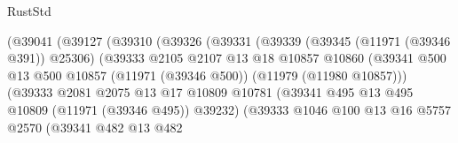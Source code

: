 \begin{lexlean}{RustStd}
\begin{coremodule}
                                  (@39041
                                    (@39127
                                      (@39310
                                        (@39326
                                          (@39331
                                            (@39339
                                              (@39345 (@11971 (@39346 @391)) @25306)
                                              (@39333
                                                @2105
                                                @2107
                                                @13
                                                @18
                                                @10857
                                                @10860
                                                (@39341
                                                  @500
                                                  @13
                                                  @500
                                                  @10857
                                                  (@11971 (@39346 @500))
                                                  (@11979 (@11980 @10857)))
                                                (@39333
                                                  @2081
                                                  @2075
                                                  @13
                                                  @17
                                                  @10809
                                                  @10781
                                                  (@39341
                                                    @495
                                                    @13
                                                    @495
                                                    @10809
                                                    (@11971 (@39346 @495))
                                                    @39232)
                                                  (@39333
                                                    @1046
                                                    @100
                                                    @13
                                                    @16
                                                    @5757
                                                    @2570
                                                    (@39341
                                                      @482
                                                      @13
                                                      @482

\end{coremodule}
\end{lexlean}
